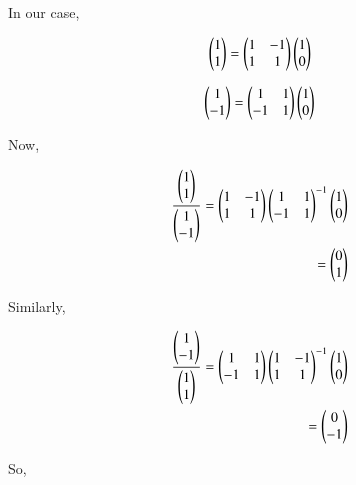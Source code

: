 In our case, 

\begin{align}
\myvec{1\\1}= \myvec{1 & -1\\1 & 1}\myvec{1\\0}
\end{align}

\begin{align}
\myvec{1\\-1}= \myvec{1 & 1\\-1 & 1}\myvec{1\\0}
\end{align}

Now,

\begin{align}
     \frac{\myvec{1\\1}}{\myvec{1\\-1}}= \myvec{1 & -1\\1 & 1}\myvec{1 & 1\\-1 & 1}^{-1}\myvec{1\\0}\\
      = \myvec{0\\1}
\end{align}

Similarly,

\begin{align}
     \frac{\myvec{1\\-1}}{\myvec{1\\1}} = \myvec{1 & 1\\-1 & 1}\myvec{1 & -1\\1 & 1}^{-1}\myvec{1\\0}\\
      = \myvec{0\\-1}
\end{align}

So,

